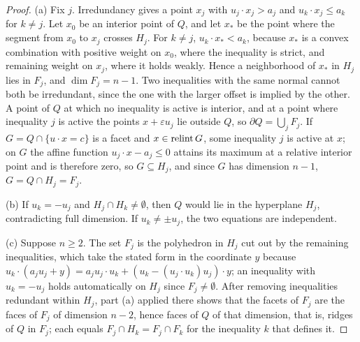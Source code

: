 \begin{proof}
(a) Fix \(j\). Irredundancy gives a point \(x_j\) with \(u_j\cdot x_j>a_j\)
and \(u_k\cdot x_j\le a_k\) for \(k\ne j\). Let \(x_0\) be an interior point of
\(Q\), and let \(x_*\) be the point where the segment from \(x_0\) to \(x_j\)
crosses \(H_j\). For \(k\ne j\), \(u_k\cdot x_*<a_k\), because \(x_*\) is a
convex combination with positive weight on \(x_0\), where the inequality
is strict, and remaining weight on \(x_j\), where it holds weakly. Hence a neighborhood of
\(x_*\) in \(H_j\) lies in \(F_j\), and \(\dim F_j=n-1\). Two inequalities
with the same normal cannot both be irredundant, since the one with the
larger offset is implied by the other. A point of \(Q\) at
which no inequality is active is interior, and at a point where
inequality \(j\) is active the points \(x+\varepsilon u_j\) lie outside \(Q\),
so \(\partial Q=\bigcup_jF_j\). If \(G=Q\cap\{u\cdot x=c\}\) is a facet and
\(x\in\operatorname{relint} G\), some inequality \(j\) is active at \(x\); on \(G\) the
affine function \(u_j\cdot x-a_j\le0\) attains its maximum at a relative
interior point and is therefore zero, so \(G\subseteq H_j\), and since \(G\) has
dimension \(n-1\), \(G=Q\cap H_j=F_j\).

(b) If \(u_k=-u_j\) and \(H_j\cap H_k\ne\emptyset\), then \(Q\) would lie in
the hyperplane \(H_j\), contradicting full dimension. If \(u_k\ne\pm u_j\),
the two equations are independent.

(c) Suppose \(n\ge2\). The set \(F_j\) is the polyhedron in \(H_j\) cut out by the remaining
inequalities, which take the stated form in the coordinate \(y\) because
\(u_k\cdot(a_ju_j+y)=a_ju_j\cdot u_k+(u_k-(u_j\cdot u_k)u_j)\cdot y\); an
inequality with \(u_k=-u_j\) holds automatically on \(H_j\) since
\(F_j\ne\emptyset\). After removing inequalities redundant within \(H_j\), part (a)
applied there shows that the facets of \(F_j\) are
the faces of \(F_j\) of dimension \(n-2\), hence faces of \(Q\) of that
dimension, that is, ridges of \(Q\) in \(F_j\); each equals
\(F_j\cap H_k=F_j\cap F_k\) for the inequality \(k\) that defines it.


\end{proof}
